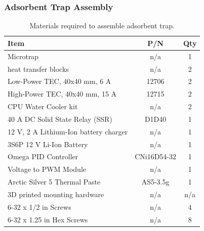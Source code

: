 \subsubsection{Adsorbent Trap Assembly}
\begin{table}[H]
    \centering
    \caption{Materials required to assemble adsorbent trap.}
    \begin{tabular}{l|c|c}
        Item & P/N & Qty\\
        \hline
        Microtrap & n/a & 1\\
        heat transfer blocks & n/a & 2\\
        Low-Power TEC,  40x40 mm, 6 A& 12706 & 2\\
        High-Power TEC, 40x40 mm, 15 A & 12715 & 2\\
        CPU Water Cooler kit & n/a & 2\\
        40 A DC Solid State Relay (SSR) & D1D40 & 1\\
        12 V, 2 A Lithium-Ion battery charger & n/a & 1\\
        3S6P 12 V Li-Ion Battery & n/a & 1\\
        Omega PID Controller & CNi16D54-32 & 1\\
        Voltage to PWM Module & n/a & 1\\
        Arctic Silver 5 Thermal Paste & AS5-3.5g & 1\\
        3D printed mounting hardware & n/a & n/a\\
        6-32 x 1/2 in Screws & n/a & 4\\
        6-32 x 1.25 in Hex Screws & n/a & 8\\
    \end{tabular}
    \label{tab: ads trap assembly materials}
\end{table}


